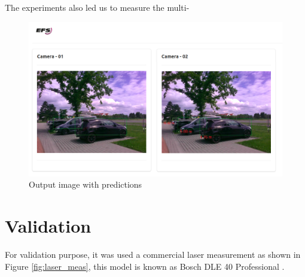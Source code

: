 The experiments also led us to measure the multi-%

\begin{figure}[H]
\centering
\includegraphics[scale=0.8]{imagens/output_framework.png}
\caption{Output image with predictions }
\label{fig:framework_predict}
\end{figure}



\section{Validation}

For validation purpose, it was used a commercial laser measurement as shown in Figure \ref{fig:laser_meas}, this model is known as Bosch DLE 40 Professional {\tiny{\textregistered}}. 



